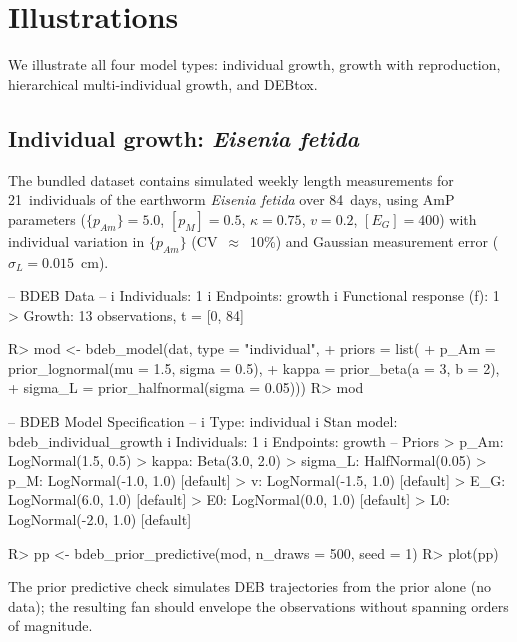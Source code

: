 \documentclass[article,shortnames]{jss}
\newcommand{\pAm}{\{p_{Am}\}}
\newcommand{\pM}{[p_M]}
\newcommand{\EG}{[E_G]}
\begin{document}
\section{Illustrations} \label{sec:illustrations}

We illustrate all four model types: individual growth, growth with
reproduction, hierarchical multi-individual growth, and DEBtox.

\subsection[Individual growth: Eisenia fetida]{%
  Individual growth: \emph{Eisenia fetida}} \label{sec:ex_ind}

The bundled  dataset contains simulated weekly
length measurements for 21~individuals of the earthworm \emph{Eisenia
fetida} over 84~days, using AmP parameters ($\pAm = 5.0$,
$\pM = 0.5$, $\kappa = 0.75$, $v = 0.2$, $\EG = 400$) with
individual variation in $\pAm$ (CV~$\approx$~10\%) and Gaussian
measurement error ($\sigma_L = 0.015$~cm).

\begin{CodeChunk}
\begin{CodeOutput}
-- BDEB Data --
i Individuals: 1
i Endpoints: growth
i Functional response (f): 1
> Growth: 13 observations, t = [0, 84]
\end{CodeOutput}
\begin{CodeInput}
R> mod <- bdeb_model(dat, type = "individual",
+    priors = list(
+      p_Am    = prior_lognormal(mu = 1.5, sigma = 0.5),
+      kappa   = prior_beta(a = 3, b = 2),
+      sigma_L = prior_halfnormal(sigma = 0.05)))
R> mod
\end{CodeInput}
\begin{CodeOutput}
-- BDEB Model Specification --
i Type: individual
i Stan model: bdeb_individual_growth
i Individuals: 1
i Endpoints: growth
-- Priors
>   p_Am: LogNormal(1.5, 0.5)
>   kappa: Beta(3.0, 2.0)
>   sigma_L: HalfNormal(0.05)
>   p_M: LogNormal(-1.0, 1.0)    [default]
>   v: LogNormal(-1.5, 1.0)      [default]
>   E_G: LogNormal(6.0, 1.0)     [default]
>   E0: LogNormal(0.0, 1.0)      [default]
>   L0: LogNormal(-2.0, 1.0)     [default]
\end{CodeOutput}
\begin{CodeInput}
R> pp <- bdeb_prior_predictive(mod, n_draws = 500, seed = 1)
R> plot(pp)
\end{CodeInput}
\end{CodeChunk}
\noindent
The prior predictive check simulates DEB trajectories from the prior
alone (no data); the resulting fan should envelope the observations
without spanning orders of magnitude.
\end{document}

